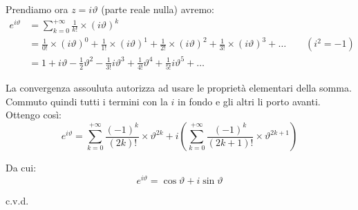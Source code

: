 \documentclass[../../analisi1]{subfiles}
\begin{document}
                Prendiamo ora \( z = i\vartheta \) (parte reale nulla) avremo:
                \begin{align*}
                    e^{i\vartheta}  &=  \sum_{k=0}^{+\infty} \frac{1}{k!} \times (i\vartheta)^k \\
                    &= \frac{1}{0!} \times (i\vartheta)^0 + \frac{1}{1!} \times (i\vartheta)^1 + \frac{1}{2!} \times (i\vartheta)^2 +  \frac{1}{3!} \times (i\vartheta)^3 + \dots  \qquad (i^2 = -1)\\
                    &= 1 + i\vartheta - \frac{1}{2}\vartheta^2 - \frac{1}{3!}i\vartheta^3 + \frac{1}{4!}\vartheta^4 + \frac{1}{5!}i\vartheta^5 + \dots
                \end{align*}
                
                La convergenza assouluta autorizza ad usare le proprietà elementari della somma. 
                Commuto quindi tutti i termini con la \(i\) in fondo e gli altri li porto avanti. Ottengo così:
                \[  e^{i\vartheta} =\sum_{k=0}^{+\infty} \frac{(-1)^k}{(2k)!} \times \vartheta^{2k} + i\left(\sum_{k=0}^{+\infty} \frac{(-1)^k}{(2k+1)!} \times \vartheta^{2k+1}  \right)\]

                Da cui:
                \[ e^{i\vartheta} = \cos \vartheta + i \sin \vartheta \]

                c.v.d.
\end{document}
